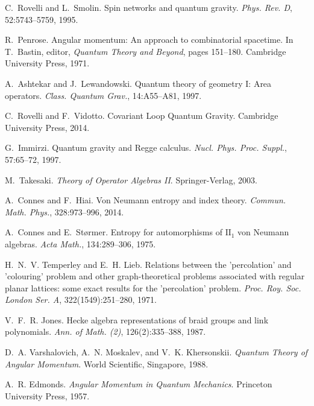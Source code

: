 \documentclass[11pt]{article}
\begin{document}
\begin{thebibliography}{9}
C.~Rovelli and L.~Smolin.
\newblock Spin networks and quantum gravity.
\newblock \emph{Phys. Rev. D}, 52:5743--5759, 1995.

R.~Penrose.
\newblock Angular momentum: An approach to combinatorial spacetime.
\newblock In T.~Bastin, editor, \emph{Quantum Theory and Beyond}, 
\newblock pages 151--180. Cambridge University Press, 1971.

A.~Ashtekar and J.~Lewandowski.
\newblock Quantum theory of geometry I: Area operators.
\newblock \emph{Class. Quantum Grav.}, 14:A55--A81, 1997.

C.~Rovelli and F.~Vidotto.
\newblock Covariant Loop Quantum Gravity.
\newblock Cambridge University Press, 2014.

G.~Immirzi.
\newblock Quantum gravity and Regge calculus.
\newblock \emph{Nucl. Phys. Proc. Suppl.}, 57:65--72, 1997.

M.~Takesaki.
\newblock \emph{Theory of Operator Algebras II}.
\newblock Springer-Verlag, 2003.

A.~Connes and F.~Hiai.
\newblock Von Neumann entropy and index theory.
\newblock \emph{Commun. Math. Phys.}, 328:973--996, 2014.

A.~Connes and E.~Størmer.
\newblock Entropy for automorphisms of $\text{II}_1$ von Neumann algebras.
\newblock \emph{Acta Math.}, 134:289--306, 1975.

H.~N.~V. Temperley and E.~H. Lieb.
\newblock Relations between the 'percolation' and 'colouring' problem and other graph-theoretical problems associated with regular planar lattices: some exact results for the 'percolation' problem.
\newblock \emph{Proc. Roy. Soc. London Ser. A}, 322(1549):251--280, 1971.

V.~F.~R. Jones.
\newblock Hecke algebra representations of braid groups and link polynomials.
\newblock \emph{Ann. of Math. (2)}, 126(2):335--388, 1987.

D.~A. Varshalovich, A.~N. Moskalev, and V.~K. Khersonskii.
\newblock \emph{Quantum Theory of Angular Momentum}.
\newblock World Scientific, Singapore, 1988.

A.~R. Edmonds.
\newblock \emph{Angular Momentum in Quantum Mechanics}.
\newblock Princeton University Press, 1957.


\end{thebibliography}
\end{document}
